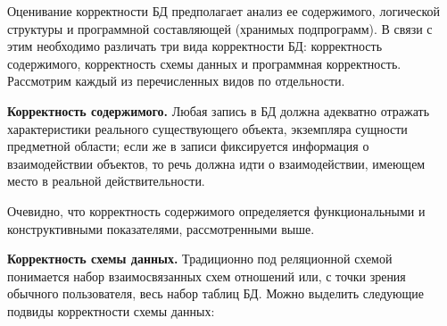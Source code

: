 Оценивание корректности БД предполагает анализ ее содержимого, логической структуры и программной составляющей
(хранимых подпрограмм). В связи с этим необходимо различать три вида корректности БД: корректность содержимого,
корректность схемы данных и программная корректность. Рассмотрим каждый из перечисленных видов по отдельности.

\textbf{Корректность содержимого.} Любая запись в БД должна адекватно отражать характеристики реального
существующего объекта, экземпляра сущности предметной области; если же в записи фиксируется информация
о взаимодействии объектов, то речь должна идти о взаимодействии, имеющем место в реальной действительности.

Очевидно, что корректность содержимого определяется функциональными и конструктивными показателями,
рассмотренными выше.

\textbf{Корректность схемы данных.} Традиционно под реляционной схемой понимается набор взаимосвязанных схем
отношений или, с точки зрения обычного пользователя, весь набор таблиц БД. Можно выделить следующие подвиды
корректности схемы данных:

